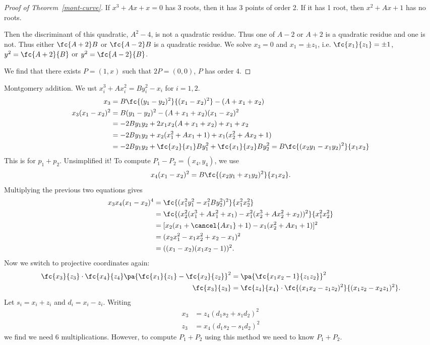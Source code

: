 \begin{proof}[Proof of Theorem~\ref{mont-curve}]
If $x^3+Ax+x=0$ has 3 roots, then it has 3 points of order 2. If it has 1 root, then $x^2+Ax+1$ has no roots.


Then the discriminant of this quadratic, $A^2-4$, is not a quadratic residue. Thus one of $A-2$ or $A+2$ is a quadratic residue and one is not. Thus either $\fc{A+2}B$ or $\fc{A-2}B$ is a quadratic residue.
We solve $x_3=0$ and $x_1=\pm z_1$, i.e. $\fc{x_1}{z_1}=\pm 1$, $y^2=\fc{A+2}{B}$ or $y^2=\fc{A-2}{B}$.

We find that there exists $P=(1,x)$ such that $2P=(0,0)$, $P$ has order 4.
\end{proof}
Montgomery addition. We ust $x_i^3+Ax_i^2=By_i^2-x_i$ for $i=1,2$.
\begin{align*}
x_3&=B\fc{(y_1-y_2)^2}{(x_1-x_2)^2}-(A+x_1+x_2)\\
x_3(x_1-x_2)^2&=B(y_1-y_2)^2 - (A+x_1+x_2)(x_1-x_2)^2\\
&=-2By_1y_2+ 2x_1x_2(A+x_1+x_2) +x_1+x_2\\
&=-2By_1y_2+ x_2(x_1^2+Ax_1+1) +x_1(x_2^2+Ax_2+1)\\
&=-2By_1y_2+\fc{x_2}{x_1}By_1^2 + \fc{x_1}{x_2}By_2^2=B\fc{(x_2y_1-x_1y_2)^2}{x_1x_2}
\end{align*}
This is for $p_1+p_2$. 
Unsimplified it!
To compute $P_1-P_2=(x_4,y_4)$, we use
\[
x_4(x_1-x_2)^2 = B\fc{(x_2y_1+x_1y_2)^2}{x_1x_2}.
\]
Multiplying the previous two equations gives
\begin{align*}
x_3x_4(x_1-x_2)^4 &= \fc{(x_1^2y_1^2-x_1^2By_2^2)^2}{x_1^2x_2^2} \\
&=\fc{(x_2^2(x_1^3+Ax_1^2+x_1)-x_1^2(x_2^3+Ax_2^2+x_2))^2}{x_1^2x_2^2}\\
&=[x_2(x_1+\cancel {Ax_1}+1)-x_1(x_2^2+Ax_1+1)]^2\\
&=(x_2x_1^2-x_1x_2^2+x_2-x_1)^2\\
&=((x_1-x_2)(x_1x_2-1))^2.
\end{align*}
Now we switch to projective coordinates again:
\begin{align*}
\fc{x_3}{z_3}\cdot \fc{x_4}{z_4}\pa{\fc{x_1}{z_1}-\fc{x_2}{z_2}}^2&=\pa{\fc{x_1x_2-1}{z_1z_2}}^2\\
\fc{x_3}{z_3}&=\fc{z_4}{x_4} \cdot \fc{(x_1x_2-z_1z_2)^2}{(x_1z_2-x_2z_1)^2}.
\end{align*}
Let $s_i=x_i+z_i$ and $d_i=x_i-z_i$. Writing
\begin{align*}
x_3&=z_4(d_1s_2+s_1d_2)^2\\
z_3&=x_4(d_1s_2-s_1d_2)^2
\end{align*}
we find we need 6 multiplications. However, to compute $P_1+P_2$ using this method we need to know $P_1+P_2$.

